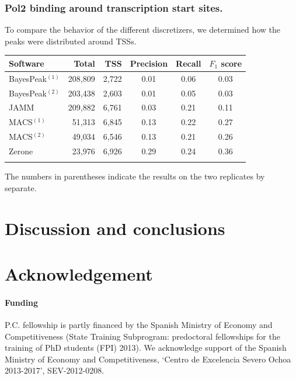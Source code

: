 \documentclass{bioinfo}
\begin{document}
\subsubsection{Pol2 binding around transcription start sites.}
To compare the behavior of the different discretizers, we determined how the
peaks were distributed around TSSs.

\begin{table}[!t]
{\begin{tabular}{lrrccc}
        \toprule
        \textbf{Software}  & \textbf{Total}  & \textbf{TSS} &
        \textbf{Precision} & \textbf{Recall} & \textbf{$F_{1}$ score} \\
        \midrule
        BayesPeak$^{(1)}$ & 208,809 & 2,722 & 0.01 & 0.06 & 0.03 \\
        BayesPeak$^{(2)}$ & 203,438 & 2,603 & 0.01 & 0.05 & 0.03 \\
        JAMM              & 209,882 & 6,761 & 0.03 & 0.21 & 0.11 \\
        MACS$^{(1)}$      &  51,313 & 6,845 & 0.13 & 0.22 & 0.27 \\
        MACS$^{(2)}$      &  49,034 & 6,546 & 0.13 & 0.21 & 0.26 \\
        Zerone            &  23,976 & 6,926 & 0.29 & 0.24 & 0.36 \\
        \botrule
\end{tabular}}{The numbers in parentheses indicate the results on the two
replicates by separate.}
\end{table}

\section{Discussion and conclusions}

\section*{Acknowledgement}

\paragraph{Funding\textcolon}
P.C. fellowship is partly financed by the Spanish Ministry of Economy and
Competitiveness (State Training Subprogram: predoctoral fellowships for the
training of PhD students (FPI) 2013).
We acknowledge support of the Spanish Ministry of Economy and Competitiveness,
`Centro de Excelencia Severo Ochoa 2013-2017', SEV-2012-0208.



\end{document}

